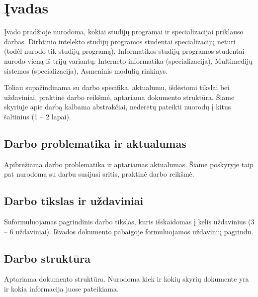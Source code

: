 \section*{Įvadas}
Įvado pradžioje nurodoma, kokiai studijų programai ir specializacijai priklauso
darbas. Dirbtinio intelekto studijų programos studentai specializacijų neturi
(todėl nurodo tik studijų programą), Informatikos studijų programos studentai
nurodo vieną iš trijų variantų: Interneto informatika (specializacija),
Multimedijų sistemos (specializacija), Asmeninis modulių rinkinys. 

Toliau supažindinama su darbo specifika, aktualumu, išdėstomi tikslai bei uždaviniai,
praktinė darbo reikšmė, aptariama dokumento struktūra. Šiame skyriuje apie
darbą kalbama abstrakčiai, nederėtų pateikti nuorodų į kitus šaltinius (1 – 2
lapai). 

\subsection*{Darbo problematika ir aktualumas}
Apibrėžiama darbo problematika ir aptariamas aktualumas. Šiame poskyryje taip pat nurodoma su darbu susijusi sritis, praktinė darbo reikšmė.
\subsection*{Darbo tikslas ir uždaviniai}
Suformuluojamas pagrindinis darbo tikslas, kuris išskaidomas į kelis uždavinius (3 – 6 uždaviniai). Išvados dokumento pabaigoje formuluojamos uždavinių pagrindu.
\subsection*{Darbo struktūra}
Aptariama dokumento struktūra. Nurodoma kiek ir kokių skyrių dokumente yra ir kokia informacija juose pateikiama.
